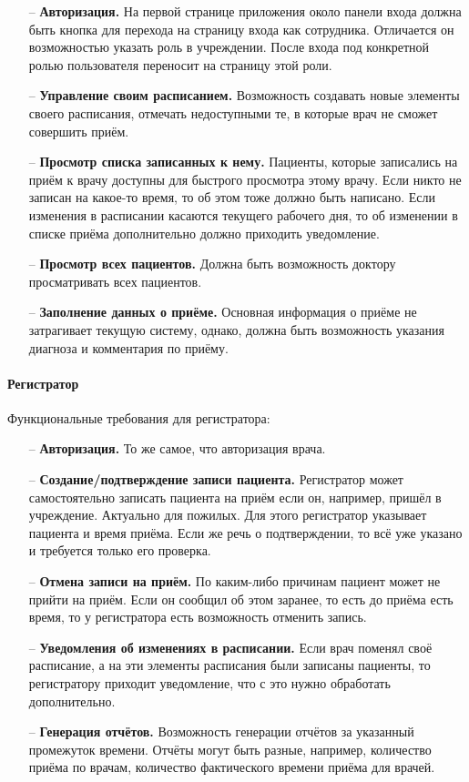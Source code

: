 \documentclass[a4paper,article]{article}
\begin{document}
    \begin{itemize}[nolistsep]
        \item[--] \textbf{Авторизация.} На первой странице приложения около панели входа должна быть кнопка для перехода на страницу входа как сотрудника. Отличается он возможностью указать роль в учреждении. После входа под конкретной ролью пользователя переносит на страницу этой роли.
        \item[--] \textbf{Управление своим расписанием.} Возможность создавать новые элементы своего расписания, отмечать недоступными те, в которые врач не сможет совершить приём.
        \item[--] \textbf{Просмотр списка записанных к нему.} Пациенты, которые записались на приём к врачу доступны для быстрого просмотра этому врачу. Если никто не записан на какое-то время, то об этом тоже должно быть написано. Если изменения в расписании касаются текущего рабочего дня, то об изменении в списке приёма дополнительно должно приходить уведомление.
        \item[--] \textbf{Просмотр всех пациентов.} Должна быть возможность доктору просматривать всех пациентов.
        \item[--] \textbf{Заполнение данных о приёме.} Основная информация о приёме не затрагивает текущую систему, однако, должна быть возможность указания диагноза и комментария по приёму.
    \end{itemize}


    \paragraph{Регистратор}\label{ТЗ. Регистратор}

    Функциональные требования для регистратора:

    \begin{itemize}[nolistsep]
        \item[--] \textbf{Авторизация.} То же самое, что авторизация врача.
        \item[--] \textbf{Создание/подтверждение записи пациента.} Регистратор может самостоятельно записать пациента на приём если он, например, пришёл в учреждение. Актуально для пожилых. Для этого регистратор указывает пациента и время приёма. Если же речь о подтверждении, то всё уже указано и требуется только его проверка.
        \item[--] \textbf{Отмена записи на приём.} По каким-либо причинам пациент может не прийти на приём. Если он сообщил об этом заранее, то есть до приёма есть время, то у регистратора есть возможность отменить запись.
        \item[--] \textbf{Уведомления об изменениях в расписании.} Если врач поменял своё расписание, а на эти элементы расписания были записаны пациенты, то регистратору приходит уведомление, что с это нужно обработать дополнительно.
        \item[--] \textbf{Генерация отчётов.} Возможность генерации отчётов за указанный промежуток времени. Отчёты могут быть разные, например, количество приёма по врачам, количество фактического времени приёма для врачей.
    \end{itemize}
\end{document}
